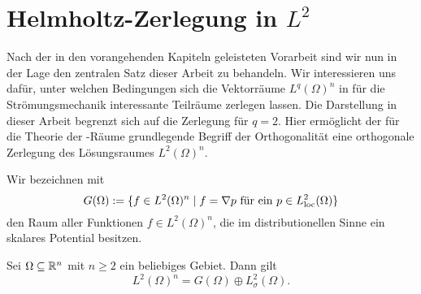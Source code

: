 \chapter{Helmholtz-Zerlegung in $L^2$}

Nach der in den vorangehenden Kapiteln geleisteten Vorarbeit sind wir nun in der Lage den zentralen Satz dieser Arbeit zu behandeln.
Wir interessieren uns dafür, unter welchen Bedingungen sich die Vektorräume $L^q(\Omega)^n$ in für die Strömungsmechanik interessante Teilräume zerlegen lassen.
Die Darstellung in dieser Arbeit begrenzt sich auf die Zerlegung für $q = 2$.
Hier ermöglicht der für die Theorie der \hilbert\hyp{}Räume grundlegende Begriff der Orthogonalität eine orthogonale Zerlegung des Lösungsraumes $L^2(\Omega)^n$.

Wir bezeichnen mit 
$$
G(\Omega) := \{f \in L^2(\Omega)^n \mid f = \nabla p \text{ für ein } p \in L^2_{\operatorname{loc}}(\Omega)\}
$$
den Raum aller Funktionen $f \in L^2(\Omega)^n$, die im distributionellen Sinne ein skalares Potential besitzen.

\begin{thm}
  \label{lem:helmholtz}
  Sei $\Omega \subseteq \mathbb{R}^n$ mit $n \geq 2$ ein beliebiges Gebiet.
  Dann gilt
  $$
  L^2(\Omega)^n = G(\Omega) \oplus L^2_\sigma(\Omega).
  $$
\end{thm}

